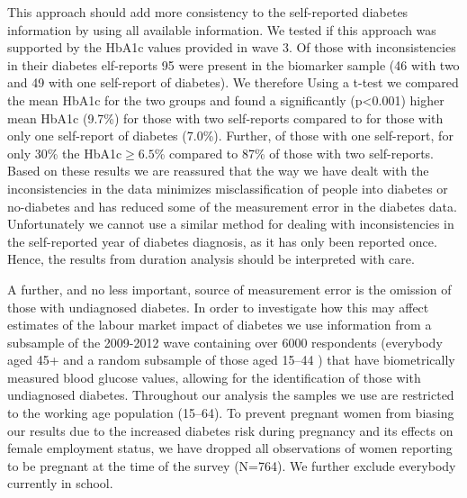 This approach should add more consistency to the self-reported diabetes information by using all available information. We tested if this approach was supported by the \ac{HbA1c} values provided in wave 3. Of those with inconsistencies in their diabetes elf-reports 95 were present in the biomarker sample (46 with two and 49 with one self-report of diabetes). We therefore  Using a t-test we compared the mean \ac{HbA1c} for the two groups and found a significantly (p<0.001) higher mean \ac{HbA1c} (9.7\%) for those with two self-reports compared to for those with only one self-report of diabetes (7.0\%). Further, of those with one self-report, for only 30\% the \ac{HbA1c}$\geq6.5$\% compared to 87\% of those with two self-reports. Based on these results we are reassured that the way we have dealt with the inconsistencies in the data minimizes misclassification of people into diabetes or no-diabetes and has reduced some of the measurement error in the diabetes data. Unfortunately we cannot use a similar method for dealing with inconsistencies in the self-reported year of diabetes diagnosis, as it has only been reported once. Hence, the results from duration analysis should be interpreted with care.


 A further, and no less important, source of measurement error is the omission of those with undiagnosed diabetes. In order to investigate how this may affect estimates of the labour market impact of diabetes we use information from a subsample of the 2009-2012 wave containing over 6000 respondents (everybody aged 45+  and a random subsample of those aged 15--44 \parencite{Crimmins2015}) that have biometrically measured blood glucose values, allowing for the identification of those with undiagnosed diabetes. 
Throughout our analysis the samples we use are restricted to the working age population (15--64). To prevent pregnant women from biasing our results due to the increased diabetes risk during pregnancy and its effects on female employment status, we have dropped all observations of women reporting to be pregnant at the time of the survey (N=764). We further exclude everybody currently in school.

